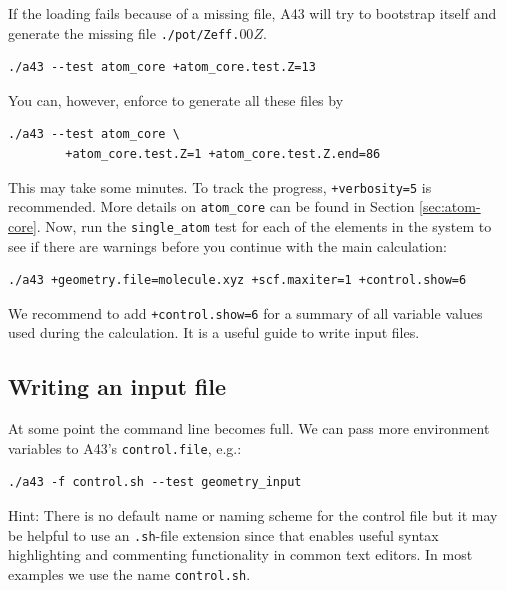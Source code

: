 \documentclass[oribibl]{llncs}
\newcommand{\ttt}[1]{\texttt{#1}}
\newcommand{\codename}{A43}
\begin{document}
\noindent
If the loading fails because of a missing file, 
\codename{} will try to bootstrap itself and generate the missing file \ttt{./pot/Zeff.}$00Z$.
\begin{verbatim}
./a43 --test atom_core +atom_core.test.Z=13
\end{verbatim}
You can, however, enforce to generate all these files by
\begin{verbatim}
./a43 --test atom_core \
        +atom_core.test.Z=1 +atom_core.test.Z.end=86
\end{verbatim}
This may take some minutes.
To track the progress, \ttt{+verbosity=5} is recommended.
More details on \ttt{atom\_core} can be found in Section \ref{sec:atom-core}.
%
\noindent
Now, run the \ttt{single\_atom} test for each of the elements in the system 
to see if there are warnings before you continue with the main calculation:
\begin{verbatim}
./a43 +geometry.file=molecule.xyz +scf.maxiter=1 +control.show=6
\end{verbatim}
%
We recommend to add \ttt{+control.show=6} for a summary of all variable values used during the calculation. It is a useful guide to write input files.
%
\subsection{Writing an input file} \label{sec:control-file}
%
At some point the command line becomes full.
We can pass more environment variables to \codename{}'s \ttt{control.file}, e.g.:
\begin{verbatim}
./a43 -f control.sh --test geometry_input
\end{verbatim}
Hint: There is no default name or naming scheme for the control file 
but it may be helpful to use an \ttt{.sh}-file extension since that
enables useful syntax highlighting and commenting functionality in common text editors.
In most examples we use the name \ttt{control.sh}.
%
%
\end{document}
